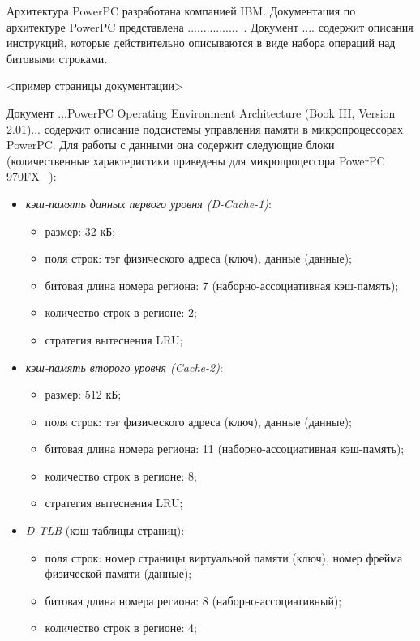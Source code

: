 \documentclass[14pt]{extreport}
\newcommand{\LRU}{\textsf{LRU}\xspace}
\begin{document}
Архитектура PowerPC разработана компанией IBM. Документация по архитектуре
PowerPC представлена ................~\cite{??????????}. Документ
.... содержит описания инструкций, которые действительно описываются в виде
набора
операций над битовыми строками.

<пример страницы документации>

Документ ...PowerPC Operating Environment Architecture (Book III, Version
2.01)... содержит описание подсистемы управления памяти в микропроцессорах
PowerPC. Для работы с данными она содержит следующие блоки (количественные
характеристики приведены для микропроцессора PowerPC 970FX
~\cite{PowerPC970FXUserManual}):
\begin{itemize}
  \item \emph{кэш-память данных первого уровня (D-Cache-1)}:
        \begin{itemize}
            \item размер: 32 кБ;
            \item поля строк: тэг физического адреса (ключ), данные (данные);
            \item битовая длина номера региона: 7 (наборно-ассоциативная
кэш-память);
            \item количество строк в регионе: 2;
            \item стратегия вытеснения \LRU;
        \end{itemize}
  \item \emph{кэш-память второго уровня (Cache-2)}:
        \begin{itemize}
            \item размер: 512 кБ;
            \item поля строк: тэг физического адреса (ключ), данные (данные);
            \item битовая длина номера региона: 11 (наборно-ассоциативная
кэш-память);
            \item количество строк в регионе: 8;
            \item стратегия вытеснения \LRU;
        \end{itemize}
  \item \emph{D-TLB} (кэш таблицы страниц):
        \begin{itemize}
            \item поля строк: номер страницы виртуальной памяти (ключ), номер
фрейма физической памяти (данные);
            \item битовая длина номера региона: 8 (наборно-ассоциативный);
            \item количество строк в регионе: 4;

\end{itemize}
\end{itemize}
\end{document}
